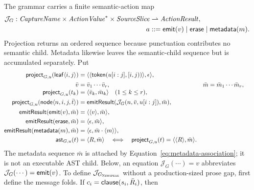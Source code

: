 The grammar carries a finite semantic-action map
\begin{equation}\label{eq:peg-action-map}
\begin{aligned}
 \mathcal J_G:
   \mathit{CaptureName}\times\mathit{ActionValue}^{*}\times
   \mathit{SourceSlice}&\rightharpoonup\mathit{ActionResult},\\
 a&::=\mathsf{emit}(v)\mid\mathsf{erase}\mid\mathsf{metadata}(m).
\end{aligned}
\end{equation}
Projection returns an ordered sequence because punctuation contributes no
semantic child.  Metadata likewise leaves the semantic-child sequence but is
accumulated separately.  Put
\begin{equation}\label{eq:ast-tree-projection}
\begin{aligned}
 \mathsf{project}_{G,u}(\mathsf{leaf}\langle i,j\rangle)
   &=\langle\langle\mathsf{token}(u[i:j],[i,j))\rangle,\epsilon\rangle,\\
 \bar v&=\bar v_1\cdots\bar v_r,
 &\bar m&=\bar m_1\cdots\bar m_r,\\[-1mm]
 \mathsf{project}_{G,u}(t_k)&=\langle\bar v_k,\bar m_k\rangle
   \quad(1\le k\le r),\\
 \mathsf{project}_{G,u}(\mathsf{node}\langle n,i,j,\bar t\rangle)
   &=\mathsf{emitResult}
      (\mathcal J_G(n,\bar v,u[i:j]),\bar m),\\
 \mathsf{emitResult}(\mathsf{emit}(v),\bar m)&=\langle\langle v\rangle,\bar m\rangle,\\
 \mathsf{emitResult}(\mathsf{erase},\bar m)&=\langle\epsilon,\bar m\rangle,\\
 \mathsf{emitResult}(\mathsf{metadata}(m),\bar m)&=
      \langle\epsilon,\bar m\cdot\langle m\rangle\rangle,\\
 \mathsf{ast}_{G,u}(t)&=\langle R,\bar m\rangle
   \quad\Longleftrightarrow\quad
   \mathsf{project}_{G,u}(t)=\langle\langle R\rangle,\bar m\rangle.
\end{aligned}
\end{equation}
The metadata sequence $\bar m$ is attached by
Equation~\eqref{eq:metadata-association}; it is not an executable AST child.
Below, an equation $\mathcal J_G(\cdots)=v$ abbreviates
$\mathcal J_G(\cdots)=\mathsf{emit}(v)$.
To define $\mathcal J_{G_{\textsc{Newspeak}}}$ without a production-sized prose gap, first
define the message folds.  If $c_i=\mathsf{clause}(s_i,\bar R_i)$, then
